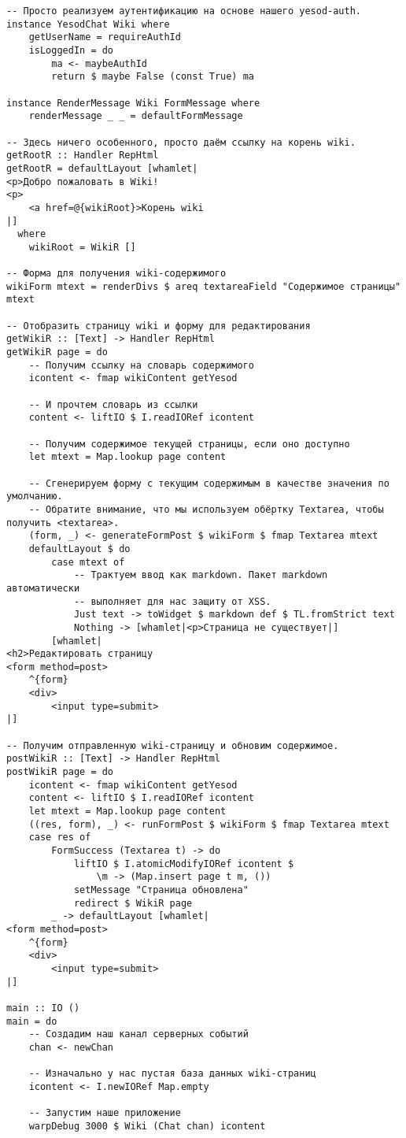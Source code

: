 \begin{lstlisting}
-- Просто реализуем аутентификацию на основе нашего yesod-auth.
instance YesodChat Wiki where
    getUserName = requireAuthId
    isLoggedIn = do
        ma <- maybeAuthId
        return $ maybe False (const True) ma

instance RenderMessage Wiki FormMessage where
    renderMessage _ _ = defaultFormMessage

-- Здесь ничего особенного, просто даём ссылку на корень wiki.
getRootR :: Handler RepHtml
getRootR = defaultLayout [whamlet|
<p>Добро пожаловать в Wiki!
<p>
    <a href=@{wikiRoot}>Корень wiki
|]
  where
    wikiRoot = WikiR []

-- Форма для получения wiki-содержимого
wikiForm mtext = renderDivs $ areq textareaField "Содержимое страницы" mtext

-- Отобразить страницу wiki и форму для редактирования
getWikiR :: [Text] -> Handler RepHtml
getWikiR page = do
    -- Получим ссылку на словарь содержимого
    icontent <- fmap wikiContent getYesod

    -- И прочтем словарь из ссылки
    content <- liftIO $ I.readIORef icontent

    -- Получим содержимое текущей страницы, если оно доступно
    let mtext = Map.lookup page content

    -- Сгенерируем форму с текущим содержимым в качестве значения по умолчанию.
    -- Обратите внимание, что мы используем обёртку Textarea, чтобы получить <textarea>.
    (form, _) <- generateFormPost $ wikiForm $ fmap Textarea mtext
    defaultLayout $ do
        case mtext of
            -- Трактуем ввод как markdown. Пакет markdown автоматически
            -- выполняет для нас защиту от XSS.
            Just text -> toWidget $ markdown def $ TL.fromStrict text
            Nothing -> [whamlet|<p>Страница не существует|]
        [whamlet|
<h2>Редактировать страницу
<form method=post>
    ^{form}
    <div>
        <input type=submit>
|]

-- Получим отправленную wiki-страницу и обновим содержимое.
postWikiR :: [Text] -> Handler RepHtml
postWikiR page = do
    icontent <- fmap wikiContent getYesod
    content <- liftIO $ I.readIORef icontent
    let mtext = Map.lookup page content
    ((res, form), _) <- runFormPost $ wikiForm $ fmap Textarea mtext
    case res of
        FormSuccess (Textarea t) -> do
            liftIO $ I.atomicModifyIORef icontent $
                \m -> (Map.insert page t m, ())
            setMessage "Страница обновлена"
            redirect $ WikiR page
        _ -> defaultLayout [whamlet|
<form method=post>
    ^{form}
    <div>
        <input type=submit>
|]

main :: IO ()
main = do
    -- Создадим наш канал серверных событий
    chan <- newChan

    -- Изначально у нас пустая база данных wiki-страниц
    icontent <- I.newIORef Map.empty

    -- Запустим наше приложение
    warpDebug 3000 $ Wiki (Chat chan) icontent
\end{lstlisting}